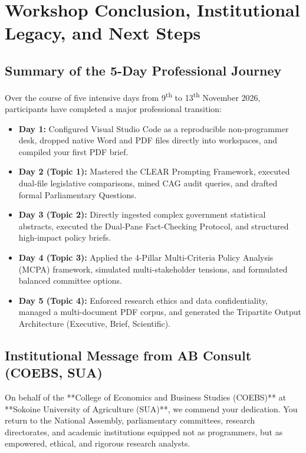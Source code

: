 \documentclass[11pt, a4paper]{report}
\begin{document}
\chapter{Workshop Conclusion, Institutional Legacy, and Next Steps}

\section{Summary of the 5-Day Professional Journey}
Over the course of five intensive days from 9\textsuperscript{th} to 13\textsuperscript{th} November 2026, participants have completed a major professional transition:
\begin{itemize}[label=-]
    \item \textbf{Day 1:} Configured Visual Studio Code as a reproducible non-programmer desk, dropped native Word and PDF files directly into workspaces, and compiled your first PDF brief.
    \item \textbf{Day 2 (Topic 1):} Mastered the CLEAR Prompting Framework, executed dual-file legislative comparisons, mined CAG audit queries, and drafted formal Parliamentary Questions.
    \item \textbf{Day 3 (Topic 2):} Directly ingested complex government statistical abstracts, executed the Dual-Pane Fact-Checking Protocol, and structured high-impact policy briefs.
    \item \textbf{Day 4 (Topic 3):} Applied the 4-Pillar Multi-Criteria Policy Analysis (MCPA) framework, simulated multi-stakeholder tensions, and formulated balanced committee options.
    \item \textbf{Day 5 (Topic 4):} Enforced research ethics and data confidentiality, managed a multi-document PDF corpus, and generated the Tripartite Output Architecture (Executive, Brief, Scientific).
\end{itemize}

\section{Institutional Message from AB Consult (COEBS, SUA)}
On behalf of the **College of Economics and Business Studies (COEBS)** at **Sokoine University of Agriculture (SUA)**, we commend your dedication. You return to the National Assembly, parliamentary committees, research directorates, and academic institutions equipped not as programmers, but as empowered, ethical, and rigorous research analysts. 
\end{document}
